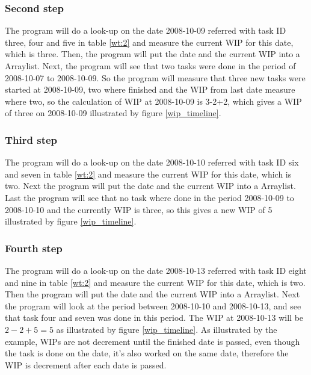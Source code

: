\documentclass[UKenglish]{ifimaster}  %
\begin{document}
\subsubsection{Second step}
The program will do a look-up on the date 2008-10-09 referred with task ID three, four and five in table \ref{wt:2}  and measure the current WIP for this date, which is three. Then, the program will put the date and the current WIP into a Arraylist.
Next, the program will see that two tasks were done in the period of 2008-10-07 to 2008-10-09. So the program will measure that three new tasks were started at 2008-10-09, two where finished and the WIP from last date measure where two, so the calculation of WIP at 2008-10-09 is 3-2+2, which gives a WIP of three on 2008-10-09 illustrated by figure \ref{wip_timeline}. 

\subsubsection{Third step}
The program will do a look-up on the date 2008-10-10 referred with task ID six and seven in table \ref{wt:2}  and measure the current WIP for this date, which is two. Next the program will put the date and the current WIP into a Arraylist.
Last the program will see that no task where done in the period 2008-10-09 to 2008-10-10 and the currently WIP is three, so this gives a new WIP of 5 illustrated by figure \ref{wip_timeline}. 

\subsubsection{Fourth step}
The program will do a look-up on the date 2008-10-13 referred with task ID eight and nine in table \ref{wt:2}  and measure the current WIP for this date, which is two. Then the program will put the date and the current WIP into a Arraylist. 
Next the program will look at the period between 2008-10-10 and 2008-10-13, and see that task four and seven was done in this period. The WIP at 2008-10-13 will be $2-2+5 = 5$ as illustrated by figure \ref{wip_timeline}. 
As illustrated by the example, WIPs are not decrement until the finished date is passed, even though the task is done on the date, it's also worked on the same date, therefore the WIP is decrement after each date is passed.
\fi
\end{document}
